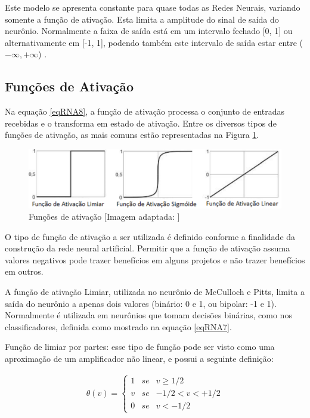 Este modelo se apresenta constante para quase todas as Redes Neurais, variando somente a função de ativação. Esta limita a amplitude do sinal de saída do neurônio. Normalmente a faixa de saída está em um intervalo fechado [0, 1] ou alternativamente em [-1, 1], podendo também este intervalo de saída estar entre (\(- \infty, + \infty\)) \cite{furtado2019redes}.

\subsection{Funções de Ativação}

Na equação \ref{eqRNA8}, a função de ativação processa o conjunto de entradas recebidas e o transforma em estado de ativação. Entre os diversos tipos de funções de ativação, as mais comuns estão representadas na Figura \ref{figfuncAtivação}. 

\begin{figure}[ht]
\centering
\includegraphics[width=1\textwidth]{figuras/funções de ativação.png}
\caption{Funções de ativação [Imagem adaptada: \cite{haykin1994neural}]}
\label{figfuncAtivação}
\end{figure}

O tipo de função de ativação a ser utilizada é definido conforme a finalidade
da construção da rede neural artificial. Permitir que a função de ativação assuma
valores negativos pode trazer benefícios em alguns projetos e não trazer benefícios
em outros.

A função de ativação Limiar, utilizada no neurônio de McCulloch e Pitts, limita a saída do neurônio a apenas dois valores (binário: 0 e 1, ou bipolar: -1 e 1). Normalmente é utilizada em neurônios que tomam decisões binárias, como nos classificadores, definida como mostrado na equação \ref{eqRNA7}.

Função de limiar por partes: esse tipo de função pode ser visto como uma aproximação de um amplificador não linear, e possui a seguinte definição:

\begin{equation} \label{eqRNA9}
\begin{split}
\theta(v) = \left\{ \begin{array}{rcl}1 & se & v\ge1/2
\\ v & se & -1/2<v<+1/2
\\ 0 & se & v<-1/2
\end{array}\right.
\end{split}
\end{equation}




